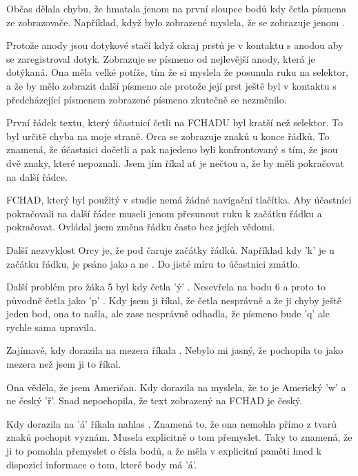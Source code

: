 Občas dělala chybu, že hmatala jenom na první sloupce bodů kdy četla písmena ze zobrazovače. Například, když bylo zobrazené  myslela, že se zobrazuje jenom .

Protože anody jsou dotykové stačí když okraj prstů je v kontaktu s anodou aby se zaregistroval dotyk.  Zobrazuje se písmeno od nejlevější anody, která je dotýkaná.  Ona měla velké potíže, tím že si myslela že posunula ruku na selektor, a že by mělo zobrazit další písmeno ale protože její prst ještě byl v kontaktu s předcházející písmenem zobrazené písmeno zkutečně se nezměnilo.

První řádek textu, který účastnicí četli na FCHADU byl kratší než selektor.  To byl určitě chyba na moje straně.  Orca se zobrazuje znaků  u konce řádků.  To znamená, že účastnici dočetli  a pak najedeno byli konfrontovaný s tím, že jsou dvě znaky, které nepoznali.  Jsem jím říkal ať je nečtou a, že by měli pokračovat na další řádce.

FCHAD, který byl použitý v studie nemá žádné navigační tlačítka.  Aby účastníci pokračovali na další řádce museli jenom přesunout ruku k začátku řádku a pokračovat. Ovládal jsem změna řádku často bez jejích vědomi.

Další nezvyklost Orcy je, že pod čaruje začátky řádků. Například kdy 'k' je u začátku řádku, je psáno jako  a ne .  Do jisté míru to účastnici zmátlo.

Další problém pro žáka 5 byl kdy četla 'ý' . Nesevřela na bodu 6 a proto to původně četla jako 'p' .  Kdy jsem ji říkal, že četla nesprávně a že ji chyby ještě jeden bod, ona to našla, ale zase nesprávně odhadla, že písmeno bude 'q'  ale rychle sama upravila.

Zajímavě, kdy dorazila na mezera \braillebox{} říkala . Nebylo mi jasný, že pochopila to jako mezera než jsem ji to říkal.

Ona věděla, že jsem Američan.  Kdy dorazila na  myslela, že to je Americký 'w' a ne český 'ř'.  Snad nepochopila, že text zobrazený na FCHAD je český.

Kdy dorazila na 'á' říkala nahlas .  Znamená to, že ona nemohla přímo z tvarů znaků pochopit vyznám. Musela explicitně o tom přemyslet.  Taky to znamená, že ji to pomohla přemyslet o čísla bodů, a že měla v explicitní paměti hned k dispozicí informace o tom, které body má 'á'.

